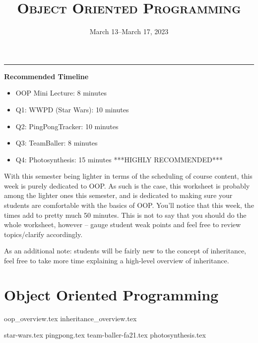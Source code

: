 \documentclass{exam}
\title{\textsc{Object Oriented Programming}}
\date{March 13--March 17, 2023}
\begin{document}
	\maketitle
	\rule{\textwidth}{0.15em}
	\fontsize{12}{15}\selectfont

\begin{meta}
	\textbf{Recommended Timeline}
	\begin{itemize}
		\item OOP Mini Lecture: 8 minutes
		\item Q1: WWPD (Star Wars): 10 minutes
		\item Q2: PingPongTracker: 10 minutes
		\item Q3: TeamBaller: 8 minutes
		\item Q4: Photosynthesis: 15 minutes ***HIGHLY RECOMMENDED*** 
	\end{itemize}
With this semester being lighter in terms of the scheduling of course content, this week is purely dedicated to OOP. As such is the case, this worksheet is probably among the lighter ones this semester, and is dedicated to making sure your students are comfortable with the basics of OOP. You'll notice that this week, the times add to pretty much 50 minutes. This is not to say that you should do the whole worksheet, however -- gauge student weak points and feel free to review topics/clarify accordingly.

As an additional note: students will be fairly new to the concept of inheritance, feel free to take more time explaining a high-level overview of inheritance. 
\end{meta}

\section{Object Oriented Programming}
{oop_overview.tex}
{inheritance_overview.tex}
\newpage
\begin{questions}
{star-wars.tex}
\newpage
{pingpong.tex}
\newpage
{team-baller-fa21.tex}
\newpage
{photosynthesis.tex}
\end{questions}
\end{document}
